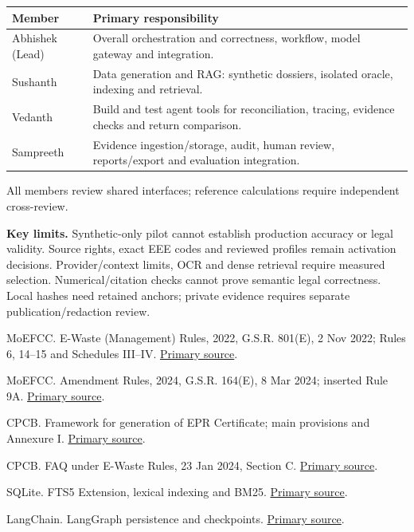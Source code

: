 \documentclass[10pt,a4paper]{article}
\newcommand{\sub}[1]{\par\vspace{3pt}{\sffamily\bfseries\color{forest}#1}\par}
\newcommand{\refitem}[3]{\par\hangindent=5mm\hangafter=1{\bfseries[#1]} #2. \href{#3}{\textcolor{forest}{Primary source}}.}
\begin{document}
{\small
\begin{tabularx}{\linewidth}{@{}L{26mm}Y@{}}\toprule
\textbf{Member} & \textbf{Primary responsibility}\\\midrule
Abhishek (Lead) & Overall orchestration and correctness, workflow, model gateway and integration.\\
Sushanth & Data generation and RAG: synthetic dossiers, isolated oracle, indexing and retrieval.\\
Vedanth & Build and test agent tools for reconciliation, tracing, evidence checks and return comparison.\\
Sampreeth & Evidence ingestion/storage, audit, human review, reports/export and evaluation integration.\\\bottomrule
\end{tabularx}}\par
All members review shared interfaces; reference calculations require independent cross-review.

\textbf{Key limits.} Synthetic-only pilot cannot establish production accuracy or legal validity. Source rights, exact EEE codes and reviewed profiles remain activation decisions. Provider/context limits, OCR and dense retrieval require measured selection. Numerical/citation checks cannot prove semantic legal correctness. Local hashes need retained anchors; private evidence requires separate publication/redaction review.

\sub{Primary references}
{\fontsize{8}{9.5}\selectfont\setlength{\parskip}{2pt}
\refitem{1}{MoEFCC. E-Waste (Management) Rules, 2022, G.S.R. 801(E), 2 Nov 2022; Rules 6, 14--15 and Schedules III--IV}{https://eprewaste.cpcb.gov.in/assets/PDF/e-waste_rules_2022.pdf}
\refitem{2}{MoEFCC. Amendment Rules, 2024, G.S.R. 164(E), 8 Mar 2024; inserted Rule 9A}{https://eprewaste.cpcb.gov.in/assets/PDF/Amendment-Rules-2024.pdf}
\refitem{3}{CPCB. Framework for generation of EPR Certificate; main provisions and Annexure I}{https://eprewaste.cpcb.gov.in/assets/PDF/Framework.pdf}
\refitem{4}{CPCB. FAQ under E-Waste Rules, 23 Jan 2024, Section C}{https://eprewaste.cpcb.gov.in/assets/PDF/faqewaste.pdf}
\refitem{5}{SQLite. FTS5 Extension, lexical indexing and BM25}{https://www.sqlite.org/fts5.html}
\refitem{6}{LangChain. LangGraph persistence and checkpoints}{https://docs.langchain.com/oss/python/langgraph/persistence}

}
\end{document}
